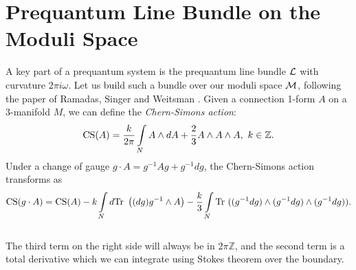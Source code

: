 \section{Prequantum Line Bundle on the Moduli Space}
\label{s:cs-bundle}
	A key part of a prequantum system is the prequantum line bundle $\mathcal{L}$ with curvature $2\pi i \omega$. Let us build such a bundle over our moduli space $\mathcal{M}$, following the paper of Ramadas, Singer and Weitsman \cite{ramadas_comments_1989}. Given a connection 1-form $A$ on a 3-manifold $M$, we can define the \textit{Chern-Simons action}:
\begin{equation}
\text{CS}(A) = \frac{k}{2\pi}\int\limits_N A\wedge dA + \frac{2}{3}A\wedge A \wedge A,~ k\in\mathbb{Z}.
\end{equation}
Under a change of gauge $g\cdot A = g^{-1}Ag + g^{-1}dg$, the Chern-Simons action transforms as 
\begin{equation}
\text{CS}(g\cdot A) = \text{CS}(A) - k \int\limits_N d\text{Tr }\left((dg)g^{-1}\wedge A\right) - \frac{k}{3}\int\limits_N \text{Tr }((g^{-1}dg)\wedge (g^{-1}dg)\wedge (g^{-1}dg)).
\label{e:cs-gauge}
\end{equation}\\
The third term on the right side will always be in $2\pi \mathbb{Z}$, and the second term is a total derivative which we can integrate using Stokes theorem over the boundary.

